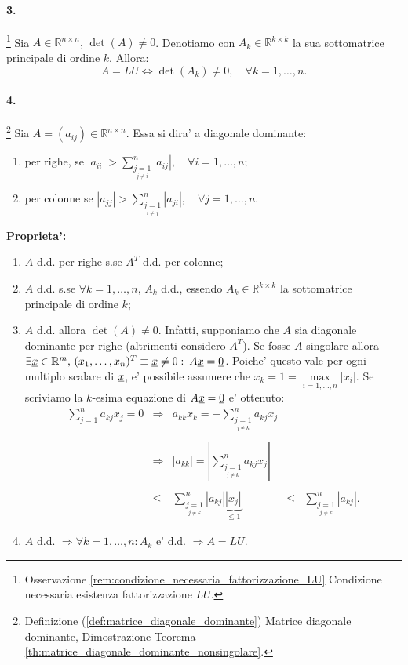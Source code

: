\paragraph{3.}\footnote{Osservazione \ref{rem:condizione_necessaria_fattorizzazione_LU} Condizione necessaria esistenza fattorizzazione $LU$.} Sia $A\in\mathbb{R}^{n \times n},\, \det(A)\neq 0$. Denotiamo con $A_k\in\mathbb{R}^{k\times k}$ la sua sottomatrice principale di ordine $k$. Allora:
\begin{equation*}
	A = LU \iff \det(A_k)\neq 0,\quad\forall k=1,\hdots, n.
\end{equation*}

\paragraph{4.}\footnote{Definizione (\ref{def:matrice_diagonale_dominante}) Matrice diagonale dominante, Dimostrazione Teorema \ref{th:matrice_diagonale_dominante_nonsingolare}.} Sia $A=(a_{ij})\in\mathbb{R}^{n \times n}$. Essa si dira' a diagonale dominante:
\begin{enumerate}
	\item per righe, se $|a_{ii}|>\sum_{\underset{j\neq i}{j=1}}^n |a_{ij}|,\quad 
	\forall i=1,\hdots, n$;
	\item per colonne se $|a_{jj}|>\sum_{\underset{i\neq j}{j=1}}^n|a_{ji}|,\quad \forall j=1,\hdots,n$.
\end{enumerate}
\textbf{Proprieta':}
\begin{enumerate}
	\item $A$ d.d. per righe s.se $A^T$ d.d. per colonne;
	\item $A$ d.d. s.se $\forall k=1,\hdots, n,\, A_k$ d.d., essendo $A_k\in\mathbb{R}^{k\times k}$ la sottomatrice principale di ordine $k$;
	\item $A$ d.d. allora $\det(A)\neq 0$. Infatti, supponiamo che $A$ sia diagonale dominante per righe (altrimenti considero $A^T$). Se fosse $A$ singolare allora $\exists \uline x\in\mathbb{R}^m,\, (x_1,\hdots, x_n)^T\equiv \uline x \neq 0\,\colon\, A\uline x = \uline 0$. Poiche' questo vale per ogni multiplo scalare di $\uline x$, e' possibile assumere che $x_k=1=\underset{i=1,\hdots, n}{\max}|x_i|$. Se scriviamo la $k$-esima equazione di $A\uline x=\uline 0$ e' ottenuto:
	\begin{equation*}
		\begin{matrix}
			\sum_{j=1}^{n}a_{kj} x_j=0 &\Rightarrow& a_{kk}x_k = -\sum_{\underset{j\neq k}{j=1}}^{n}a_{kj} x_j && \\\\
			&\Rightarrow& |a_{kk}| = \left|\sum_{\underset{j\neq k}{j=1}}^{n}a_{kj} x_j\right| &&\\\\
			&\leq& \sum_{\underset{j\neq k}{j=1}}^{n}|a_{kj}| \underbrace{|x_j|}_{\leq 1} &\leq& \sum_{\underset{j\neq k}{j=1}}^{n}|a_{kj}|.
		\end{matrix}
	\end{equation*}
	\item $A$ d.d. $\Rightarrow\forall k=1,\hdots,n\colon A_k$ e' d.d. $\Rightarrow A=LU$.
\end{enumerate}

